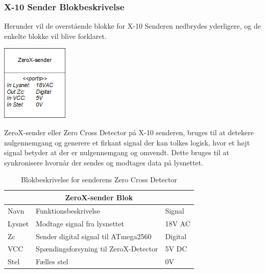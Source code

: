 \documentclass[11pt]{article}
\begin{document}
\subsubsection*{X-10 Sender Blokbeskrivelse}
Herunder vil de overstående blokke for X-10 Senderen nedbrydes yderligere, og de enkelte blokke vil blive forklaret.\newline

\begin{minipage}[Ht]{0.40\linewidth}
	\centering
	\includegraphics{ZeroX-sender-blok.png}
\end{minipage}
\hfill
\begin{minipage}[!t]{0.60\linewidth}
	\centering
  		 ZeroX-sender eller Zero Cross Detector på X-10 senderen, bruges til at detekere nulgennemgang og generere et firkant signal der kan tolkes logisk, hvor et højt signal betyder at der er nulgennemgang og omvendt. Dette bruges til at synkronisere hvornår der sendes og modtages data på lysnettet.
\end{minipage}%
\hfill

\begin{table}[H]
\centering
	\begin{tabular}{l|l|l}
	
	\toprule[0.4mm]\midrule \multicolumn{3}{c}{\textbf{ZeroX-sender Blok}}\\
	\midrule[0.4mm] Navn & Funktionsbeskrivelse & Signal\\ \midrule[0.3mm]
	 Lysnet & Modtage signal fra lysnettet & 18V AC\\
	 Zc & Sender digital signal til ATmega2560 & Digital\\
	 VCC & Spændingsforsyning til ZeroX-Detector & 5V DC\\
	 Stel & Fælles stel  & 0V\\
	 \midrule\bottomrule[0.4mm]

	\end{tabular}
	\caption{Blokbeskrivelse for senderens Zero Cross Detector}
	\label{tab: Bloktabel ZeroX sender}
\end{table}
\qquad
\end{document}
